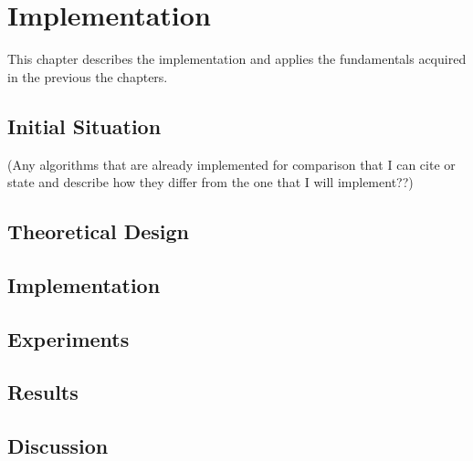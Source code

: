 \chapter{Implementation}
\label{ch:Implementation}

This chapter describes the implementation and applies the fundamentals acquired in the previous the chapters.

\section{Initial Situation}

 (Any algorithms that are already implemented for comparison that I can cite or state and describe how they differ from the one that I will implement??)

\section{Theoretical Design}



\section{Implementation}

\section{Experiments}

\section{Results}

\section{Discussion}

